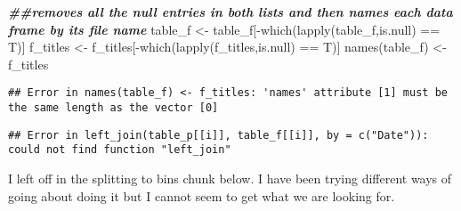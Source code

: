 \documentclass[
]{article}
\newenvironment{Shaded}{\begin{snugshade}}{\end{snugshade}}
\newcommand{\AttributeTok}[1]{\textcolor[rgb]{0.77,0.63,0.00}{#1}}
\newcommand{\ControlFlowTok}[1]{\textcolor[rgb]{0.13,0.29,0.53}{\textbf{#1}}}
\newcommand{\DecValTok}[1]{\textcolor[rgb]{0.00,0.00,0.81}{#1}}
\newcommand{\DocumentationTok}[1]{\textcolor[rgb]{0.56,0.35,0.01}{\textbf{\textit{#1}}}}
\newcommand{\FunctionTok}[1]{\textcolor[rgb]{0.00,0.00,0.00}{#1}}
\newcommand{\NormalTok}[1]{#1}
\newcommand{\OtherTok}[1]{\textcolor[rgb]{0.56,0.35,0.01}{#1}}
\newcommand{\SpecialCharTok}[1]{\textcolor[rgb]{0.00,0.00,0.00}{#1}}
\newcommand{\StringTok}[1]{\textcolor[rgb]{0.31,0.60,0.02}{#1}}
\begin{document}
\begin{Shaded}
\begin{Highlighting}[]
\DocumentationTok{\#\#removes all the null entries in both lists and then names each data frame by its file name}
\NormalTok{table\_f }\OtherTok{\textless{}{-}}\NormalTok{ table\_f[}\SpecialCharTok{{-}}\FunctionTok{which}\NormalTok{(}\FunctionTok{lapply}\NormalTok{(table\_f,is.null) }\SpecialCharTok{==}\NormalTok{ T)]}
\NormalTok{f\_titles }\OtherTok{\textless{}{-}}\NormalTok{ f\_titles[}\SpecialCharTok{{-}}\FunctionTok{which}\NormalTok{(}\FunctionTok{lapply}\NormalTok{(f\_titles,is.null) }\SpecialCharTok{==}\NormalTok{ T)]}
\FunctionTok{names}\NormalTok{(table\_f) }\OtherTok{\textless{}{-}}\NormalTok{ f\_titles}
\end{Highlighting}
\end{Shaded}

\begin{verbatim}
## Error in names(table_f) <- f_titles: 'names' attribute [1] must be the same length as the vector [0]
\end{verbatim}

\begin{Shaded}
\end{Shaded}

\begin{verbatim}
## Error in left_join(table_p[[i]], table_f[[i]], by = c("Date")): could not find function "left_join"
\end{verbatim}

I left off in the splitting to bins chunk below. I have been trying
different ways of going about doing it but I cannot seem to get what we
are looking for.
\end{document}
